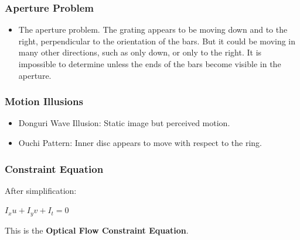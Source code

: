\begin{frame}
  \frametitle{Aperture Problem}
  \begin{figure}[!h]
    \hspace*{2em}
  \end{figure}
  \begin{itemize}
    \item The aperture problem. The grating appears to be moving down and to the right, perpendicular to the orientation of the bars. But it could be moving in many other directions, such as only down, or only to the right. It is impossible to determine unless the ends of the bars become visible in the aperture.
  \end{itemize}
\end{frame}

\begin{frame}
  \frametitle{Motion Illusions}
\begin{itemize}
  \item Donguri Wave Illusion: Static image but perceived motion.
  \item Ouchi Pattern: Inner disc appears to move with respect to the ring.
\end{itemize}

\vspace{0.5cm}
\centering
\end{frame}

\begin{frame}
  \frametitle{Constraint Equation}
After simplification:

$ I_x u + I_y v + I_t = 0 $

This is the \textbf{Optical Flow Constraint Equation}.

\vspace{0.5cm}
\centering
\end{frame}

